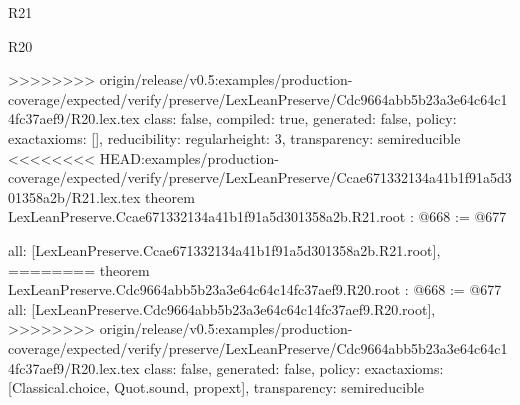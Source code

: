 \begin{lexlean}{R21}
\begin{lexlean}{R20}
\begin{coremodule}
{{{{{{{{{{{>>>>>>>> origin/release/v0.5:examples/production-coverage/expected/verify/preserve/LexLeanPreserve/Cdc9664abb5b23a3e64c64c14fc37aef9/R20.lex.tex
  class: false,
  compiled: true,
  generated: false,
  policy: exact{axioms: []},
  reducibility: regular{height: 3},
  transparency: semireducible
}
<<<<<<<< HEAD:examples/production-coverage/expected/verify/preserve/LexLeanPreserve/Ccae671332134a41b1f91a5d301358a2b/R21.lex.tex
theorem LexLeanPreserve.Ccae671332134a41b1f91a5d301358a2b.R21.root : @668 := @677 {
  all: [LexLeanPreserve.Ccae671332134a41b1f91a5d301358a2b.R21.root],
========
theorem LexLeanPreserve.Cdc9664abb5b23a3e64c64c14fc37aef9.R20.root : @668 := @677 {
  all: [LexLeanPreserve.Cdc9664abb5b23a3e64c64c14fc37aef9.R20.root],
>>>>>>>> origin/release/v0.5:examples/production-coverage/expected/verify/preserve/LexLeanPreserve/Cdc9664abb5b23a3e64c64c14fc37aef9/R20.lex.tex
  class: false,
  generated: false,
  policy: exact{axioms: [Classical.choice, Quot.sound, propext]},
  transparency: semireducible
}

}}}}}}}}}}}
\end{coremodule}
\end{lexlean}
\end{lexlean}
